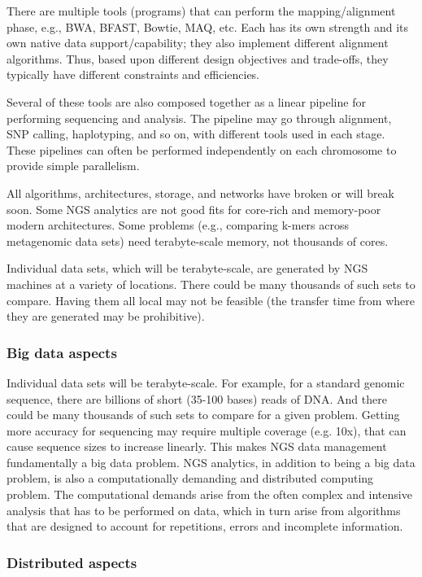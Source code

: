 There are multiple tools (programs) that can perform the mapping/alignment
phase, e.g., BWA, BFAST, Bowtie, MAQ, etc. Each has its own strength and
its own native data support/capability; they also implement
different alignment algorithms. Thus, based upon different design
objectives and trade-offs, they typically have different constraints
and efficiencies.

Several of these tools are also composed together as a linear pipeline
for performing sequencing and analysis. The pipeline may go through
alignment, SNP calling, haplotyping, and so on, with different tools
used in each stage. These pipelines can often be performed
independently on each chromosome to provide simple parallelism.

All algorithms, architectures, storage, and networks have broken or
will break soon.  Some NGS analytics are not good fits for core-rich
and memory-poor modern architectures. Some problems (e.g., comparing
k-mers across metagenomic data sets) need terabyte-scale memory, not
thousands of cores.~\cite{ngs-gap}

Individual data sets, which will be terabyte-scale, are generated by
NGS machines at a variety of locations. There could be many thousands
of such sets to compare. Having them all local may not be feasible
(the transfer time from where they are generated may be prohibitive).

\subsubsection*{Big data aspects}

Individual data sets will be terabyte-scale. For example, for a
standard genomic sequence, there are billions of short (35-100 bases)
reads of DNA.  And there could be many thousands of such sets to
compare for a given problem.  Getting more accuracy for sequencing may
require multiple coverage (e.g. 10x), that can cause sequence sizes to
increase linearly.  This makes NGS data management fundamentally a big
data problem.  NGS analytics, in addition to being a big data problem,
is also a computationally demanding and distributed computing problem.
The computational demands arise from the often complex and intensive
analysis that has to be performed on data, which in turn arise from
algorithms that are designed to account for repetitions, errors and
incomplete information.

\subsubsection*{Distributed aspects}

